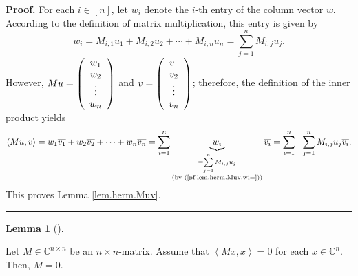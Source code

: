 \documentclass[numbers=enddot,12pt,final,onecolumn,notitlepage]{scrartcl}%
\numberwithin{exer}{subsection}
\theoremstyle{definition}
\newtheorem{lem}[theo]{Lemma}
\newenvironment{lemma}[1][]
{\begin{lem}[#1]\begin{leftbar}}
{\end{leftbar}\end{lem}}
\newenvironment{proof}[1][Proof]{\noindent\textbf{#1.} }{\ \rule{0.5em}{0.5em}}
\let\sumnonlimits\sum
\renewcommand{\sum}{\sumnonlimits\limits}
\begin{document}
\begin{proof}
For each $i\in\left[  n\right]  $, let $w_{i}$ denote the $i$-th entry of the
column vector $w$. According to the definition of matrix multiplication, this
entry is given by%
\begin{equation}
w_{i}=M_{i,1}u_{1}+M_{i,2}u_{2}+\cdots+M_{i,n}u_{n}=\sum_{j=1}^{n}M_{i,j}%
u_{j}. \label{pf.lem.herm.Muv.wi=}%
\end{equation}
However, $Mu=\left(
\begin{array}
[c]{c}%
w_{1}\\
w_{2}\\
\vdots\\
w_{n}%
\end{array}
\right)  $ and $v=\left(
\begin{array}
[c]{c}%
v_{1}\\
v_{2}\\
\vdots\\
v_{n}%
\end{array}
\right)  $; therefore, the definition of the inner product yields%
\[
\left\langle Mu,v\right\rangle =w_{1}\overline{v_{1}}+w_{2}\overline{v_{2}%
}+\cdots+w_{n}\overline{v_{n}}=\sum_{i=1}^{n}\underbrace{w_{i}}%
_{\substack{=\sum_{j=1}^{n}M_{i,j}u_{j}\\\text{(by (\ref{pf.lem.herm.Muv.wi=}%
))}}}\overline{v_{i}}=\sum_{i=1}^{n}\ \ \sum_{j=1}^{n}M_{i,j}u_{j}%
\overline{v_{i}}.
\]
This proves Lemma \ref{lem.herm.Muv}.
\end{proof}

\begin{lemma}
\label{lem.herm.M=0}Let $M\in\mathbb{C}^{n\times n}$ be an $n\times n$-matrix.
Assume that $\left\langle Mx,x\right\rangle =0$ for each $x\in\mathbb{C}^{n}$.
Then, $M=0$.
\end{lemma}
\end{document}
